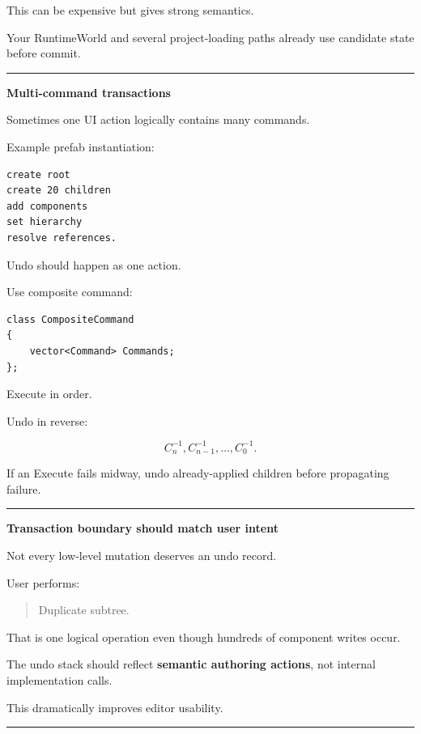 This can be expensive but gives strong semantics.

Your RuntimeWorld and several project-loading paths already use candidate state before commit.

\begin{center}\rule{0.5\linewidth}{0.5pt}\end{center}

\textbf{Multi-command transactions}

Sometimes one UI action logically contains many commands.

Example prefab instantiation:

\begin{verbatim}
create root
create 20 children
add components
set hierarchy
resolve references.
\end{verbatim}

Undo should happen as one action.

Use composite command:

\begin{verbatim}
class CompositeCommand
{
    vector<Command> Commands;
};
\end{verbatim}

Execute in order.

Undo in reverse:

\[
C_n^{-1},
C_{n-1}^{-1},
\dots,
C_0^{-1}.
\]

If an Execute fails midway, undo already-applied children before propagating failure.

\begin{center}\rule{0.5\linewidth}{0.5pt}\end{center}

\textbf{Transaction boundary should match user intent}

Not every low-level mutation deserves an undo record.

User performs:

\begin{quote}
Duplicate subtree.
\end{quote}

That is one logical operation even though hundreds of component writes occur.

The undo stack should reflect \textbf{semantic authoring actions}, not internal implementation calls.

This dramatically improves editor usability.

\begin{center}\rule{0.5\linewidth}{0.5pt}\end{center}

